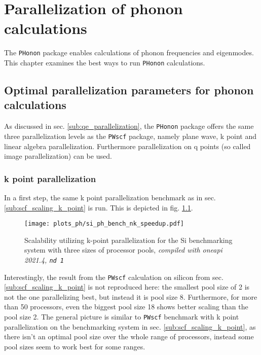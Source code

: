\documentclass[main.tex]{subfiles}
\begin{document}
\chapter{Parallelization of phonon calculations}\label{ch:optimization_ph}

The \texttt{PHonon} package enables calculations of phonon frequencies and eigenmodes.
This chapter examines the best ways to run \texttt{PHonon} calculations.

\section{Optimal parallelization parameters for phonon calculations}

As discussed in sec. \ref{sub:qe_parallelization}, the \texttt{PHonon} package offers the same three parallelization levels as the \texttt{PWscf} package, namely plane wave, k point and linear algebra parallelization.
Furthermore parallelization on q points (so called image parallelization) can be used.

\subsection{k point parallelization}

In a first step, the same k point parallelization benchmark as in sec. \ref{sub:scf_scaling_k_point} is run. This is depicted in fig. \ref{fig:scaling_ph_nk_si}.

\begin{figure}[htb!]
    \centering
    \texttt{[image: plots\_ph/si\_ph\_bench\_nk\_speedup.pdf]}
    \caption{Scalability utilizing k-point parallelization for the Si benchmarking system with three sizes of processor pools, \emph{\QE compiled with \gls{oneapi} 2021.4, \texttt{nd 1}}}
    \label{fig:scaling_ph_nk_si}
\end{figure}
Interestingly, the result from the \texttt{PWscf} calculation on silicon from sec. \ref{sub:scf_scaling_k_point} is not reproduced here: the smallest pool size of 2 is not the one parallelizing best, but instead it is pool size 8.
Furthermore, for more than 50 processors, even the biggest pool size 18 shows better scaling than the pool size 2.
The general picture is similar to \texttt{PWscf} benchmark with k point parallelization on the \TaS benchmarking system in sec. \ref{sub:scf_scaling_k_point}, as there isn't an optimal pool size over the whole range of processors, instead some pool sizes seem to work best for some ranges.
\end{document}
